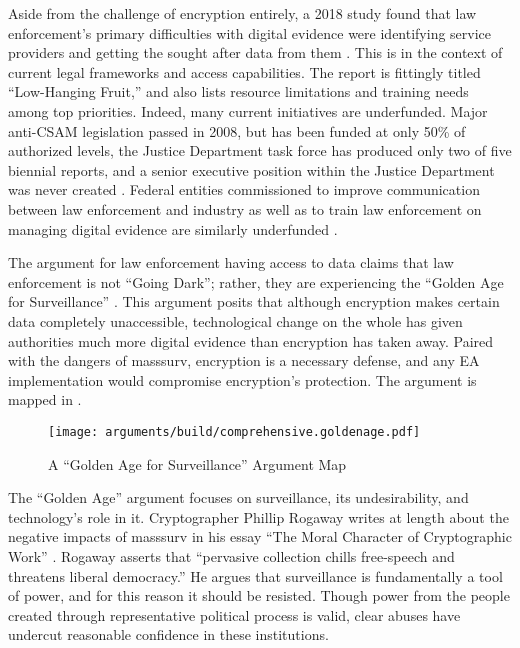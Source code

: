 
Aside from the challenge of encryption entirely, a 2018 study found that law enforcement's primary difficulties with
digital evidence were identifying service providers and getting the sought after data from them \cite{carter_2018}. This
is in the context of current legal frameworks and access capabilities. The report is fittingly titled ``Low-Hanging
Fruit,'' and also lists resource limitations and training needs among top priorities. Indeed, many current initiatives
are underfunded. Major anti-\ac{CSAM} legislation passed in 2008, but has been funded at only 50\% of authorized levels,
the Justice Department task force has produced only two of five biennial reports, and a senior executive position within
the Justice Department was never created \cite{keller_internet_2019}. Federal entities commissioned to improve
communication between law enforcement and industry as well as to train law enforcement on managing digital evidence are
similarly underfunded \cite{carter_2018}.


The argument for law enforcement having  access to data claims that law enforcement is not ``Going Dark'';
rather, they are experiencing the ``Golden Age for Surveillance'' \cite{swire_encryption_2011}. This argument posits
that although encryption makes certain data completely unaccessible, technological change on the whole has given
authorities much more digital evidence than encryption has taken away. Paired with the dangers of \ac{masssurv},
encryption is a necessary defense, and any \ac{EA} implementation would compromise encryption's protection. The argument
is mapped in .

\begin{figure}[p!]
  \centering\CaptionFontSize
  \texttt{[image: arguments/build/comprehensive.goldenage.pdf]}
  \caption{A ``Golden Age for Surveillance'' Argument Map}
  \label{fig-arg-golden-age}
\end{figure}

The ``Golden Age'' argument focuses on surveillance, its undesirability, and technology's role in it. Cryptographer
Phillip Rogaway writes at length about the negative impacts of \ac{masssurv} in his essay ``The Moral Character of
Cryptographic Work'' \cite{rogaway_moral_2015}. Rogaway asserts that ``pervasive collection  chills
free-speech and threatens liberal democracy.'' He argues that surveillance is fundamentally a tool of power, and for
this reason it should be resisted. Though power from the people created through representative political process is
valid, clear abuses have undercut reasonable confidence in these institutions.

